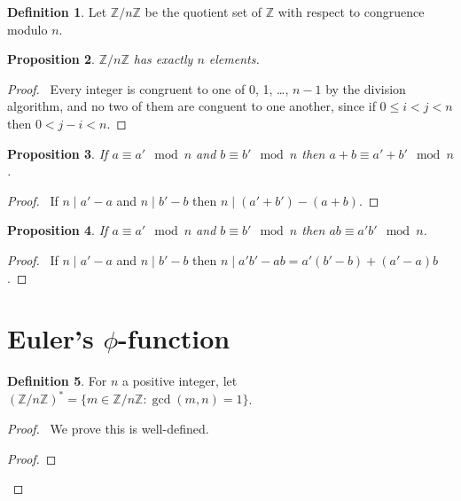 \documentclass{book}
\let\qed\relax
\newtheorem{prop}{Proposition}[chapter]
\theoremstyle{definition}
\newtheorem{df}[prop]{Definition}
\begin{document}
\begin{df}
    Let $\mathbb{Z} / n \mathbb{Z}$ be the quotient set of $\mathbb{Z}$ with respect to congruence modulo $n$.
\end{df}

\begin{prop}
    $\mathbb{Z} / n \mathbb{Z}$ has exactly $n$ elements.
\end{prop}

\begin{proof}
    \pf\ Every integer is congruent to one of 0, 1, \ldots, $n - 1$ by the division algorithm, and no two of them are conguent to one another, since if $0 \leq i < j < n$ then $0 < j - i < n$. \qed
\end{proof}

\begin{prop}
    If $a \equiv a' \mod n$ and $b \equiv b' \mod n$ then $a + b \equiv a' + b' \mod n$.
\end{prop}

\begin{proof}
    \pf\ If $n \mid a' - a$ and $n \mid b' - b$ then $n \mid (a' + b') - (a + b)$. \qed
\end{proof}

\begin{prop}
    If $a \equiv a' \mod n$ and $b \equiv b' \mod n$ then $ab \equiv a'b' \mod n$.
\end{prop}

\begin{proof}
    \pf\ If $n \mid a' - a$ and $n \mid b' - b$ then $n \mid a'b' - ab = a'(b'-b) + (a'-a)b$. \qed
\end{proof}

\section{Euler's $\phi$-function}

\begin{df}
For $n$ a positive integer, let $(\mathbb{Z} / n \mathbb{Z})^* = \{ m \in \mathbb{Z} / n \mathbb{Z} : \gcd(m,n) = 1 \}$.
\end{df}

\begin{proof}
    \pf\ We prove this is well-defined.
    \begin{proof}
    \end{proof}
    \qed
\end{proof}
\end{document}
